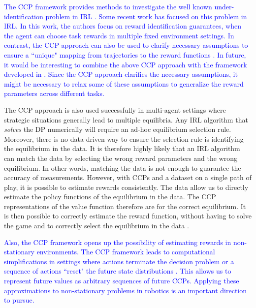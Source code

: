 \documentclass{article}
\begin{document}
\textcolor{blue}{
The CCP framework provides methods to investigate the well known under-identification problem in IRL \cite{abbeel2004apprenticeship}. Some recent work \cite{amin2016resolving} has focused on this problem in IRL. In this work, the authors focus on reward identification guarantees, when the agent can choose task rewards in multiple fixed environment settings. In contrast, the CCP approach can also be used to clarify necessary assumptions to ensure a ``unique" mapping from trajectories to the reward functions \cite{magnac}.
In future, it would be interesting to combine the above CCP approach with the framework developed in \cite{amin2016resolving}.
Since the CCP approach clarifies the necessary assumptions, it might be necessary to relax some of these assumptions to generalize the reward parameters across different tasks.
}

The CCP approach is also used successfully in multi-agent settings where strategic situations generally lead to multiple equilibria. Any IRL algorithm that \emph{solves} the DP numerically will require an ad-hoc equilibrium selection rule. Moreover, there is no data-driven way to ensure the selection rule is identifying the equilibrium in the data. It is therefore highly likely that an IRL algorithm can match the data by selecting the wrong reward parameters and the wrong equilibrium. In other words, matching the data is not enough to guarantee the accuracy of measurements. However, with CCPs and a dataset on a single path of play, it is possible to estimate rewards consistently. The data allow us to directly estimate the policy functions of the equilibrium in the data. The CCP representations of the value function therefore are for the correct equilibrium. It is then possible to correctly estimate the reward function, without having to solve the game and to correctly select the equilibrium in the data \cite{bajari_discrete_games,aguirregabiria,pesendorfer,pese}.

\textcolor{blue}{
Also, the CCP framework opens up the possibility of estimating rewards in non-stationary environments. The CCP framework leads to computational simplifications in settings where actions terminate the decision problem or a sequence of actions ``reset" the future state distributions \cite{arcidiacono2014nonstationary}. This allows us to represent future values as arbitrary sequences of future CCPs.
Applying these approximations to non-stationary problems in robotics \cite{ma2017forecasting} is an important direction to pursue.
}
\end{document}
